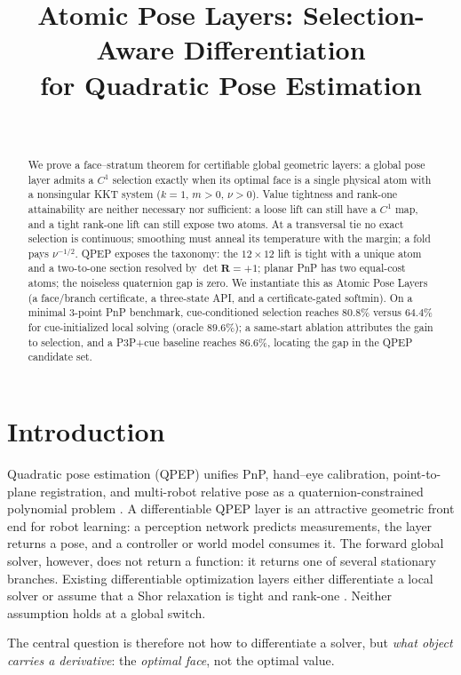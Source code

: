 \documentclass[conference]{IEEEtran}
\title{Atomic Pose Layers: Selection-Aware Differentiation\\ for Quadratic Pose Estimation}
\author{\IEEEauthorblockN{Anonymous Authors}\\
\IEEEauthorblockA{Paper under review}}
\newcommand{\bR}{\bm{R}}
\begin{document}
\maketitle

\begin{abstract}
We prove a face--stratum theorem for certifiable global geometric layers: a global pose layer admits a $C^1$ selection exactly when its optimal face is a single physical atom with a nonsingular KKT system ($k=1$, $m>0$, $\nu>0$). Value tightness and rank-one attainability are neither necessary nor sufficient: a loose lift can still have a $C^1$ map, and a tight rank-one lift can still expose two atoms. At a transversal tie no exact selection is continuous; smoothing must anneal its temperature with the margin; a fold pays $\nu^{-1/2}$. QPEP exposes the taxonomy: the $12\times12$ lift is tight with a unique atom and a two-to-one section resolved by $\det\bR=+1$; planar PnP has two equal-cost atoms; the noiseless quaternion gap is zero. We instantiate this as Atomic Pose Layers (a face/branch certificate, a three-state API, and a certificate-gated softmin). On a minimal 3-point PnP benchmark, cue-conditioned selection reaches $80.8\%$ versus $64.4\%$ for cue-initialized local solving (oracle $89.6\%$); a same-start ablation attributes the gain to selection, and a P3P+cue baseline reaches $86.6\%$, locating the gap in the QPEP candidate set.\end{abstract}

\section{Introduction}
Quadratic pose estimation (QPEP) unifies PnP, hand--eye calibration, point-to-plane registration, and multi-robot relative pose as a quaternion-constrained polynomial problem \cite{wu2022qpep}. A differentiable QPEP layer is an attractive geometric front end for robot learning: a perception network predicts measurements, the layer returns a pose, and a controller or world model consumes it. The forward global solver, however, does not return a function: it returns one of several stationary branches. Existing differentiable optimization layers either differentiate a local solver \cite{amos2017optnet,pineda2022theseus,chen2020bpnp} or assume that a Shor relaxation is tight and rank-one \cite{holmes2025sdpr}. Neither assumption holds at a global switch.

The central question is therefore not how to differentiate a solver, but \emph{what object carries a derivative}: the \emph{optimal face}, not the optimal value.
\end{document}
